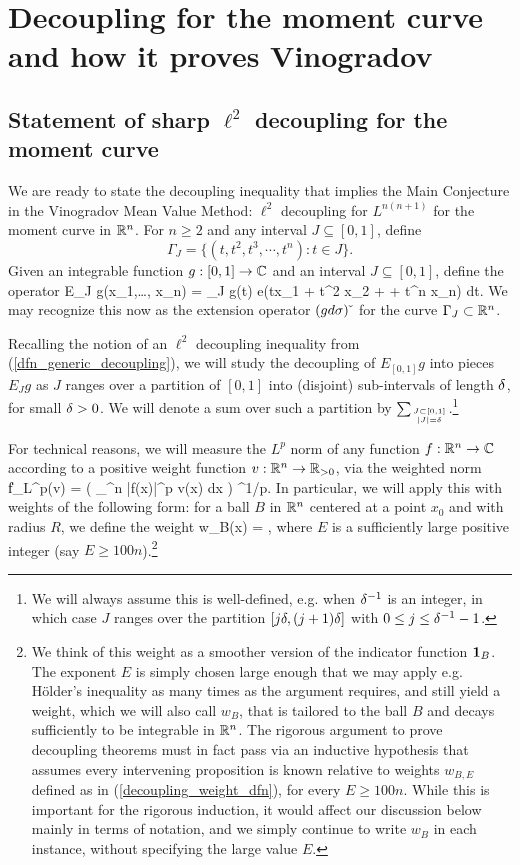 \documentclass[brochure,english,12pt]{bourbaki}%
\newcommand{\C}{\mathbb{C}}
\begin{document}
\section{Decoupling for the moment curve and how it proves Vinogradov}\label{sec_decoupling_VMVT}
\subsection{Statement of sharp $\ell^2$ decoupling for the moment curve}
We are ready to state the decoupling inequality that implies the Main Conjecture in the Vinogradov Mean Value Method: $\ell^2$ decoupling for $L^{n(n+1)}$ for the moment curve in $\mathbb{R}^n$. For $n \geq 2$ and any interval $J \subseteq [0,1]$, define 
\[ \Gamma_J = \{ (t,t^2, t^3, \cdots, t^n): t\in J \}.\]
Given an integrable function $g : [0,1] \maps \C$ and an interval $J \subseteq [0,1]$, define the operator
\beq\label{extn_Ga_op}
 E_J g(x_1,\ldots, x_n) = \int_J g(t) e(tx_1 + t^2 x_2 + \cdots + t^n x_n) dt.
 \eeq
We may recognize this now as the extension operator $(g d\sigma)\check{\;}$ for the curve $\Gamma_J \subset \mathbb{R}^n$.


Recalling the notion of an $\ell^2$ decoupling inequality from (\ref{dfn_generic_decoupling}), we will study the decoupling of $E_{[0,1]}g$ into pieces $E_Jg$ as $J$ ranges over a partition of $[0,1]$ into (disjoint) sub-intervals of length $\delta$, for  small $\delta>0$. We will denote a sum over such a partition by $\sum_{J \subset [0,1] \atop |J|=\delta}$.\footnote{We will always assume this is well-defined, e.g. when $\delta^{-1}$ is an integer, in which case $J$ ranges over the partition $[j\delta, (j+1)\delta]$ with $0 \leq j \leq \delta^{-1}-1$.}


For technical reasons, we will measure the $L^p$ norm of any function $f : \R^n \maps \C$ according to a positive weight function $v: \mathbb{R}^n \rightarrow \mathbb{R}_{>0}$, via the weighted norm
\beq\label{decoupling_weighted_norm}
 \|f\|_{L^p(v)} = ( \int_{\R^n} |f(x)|^p v(x) dx ) ^{1/p}.
 \eeq
In particular, we will apply this with weights of the following form: for a ball $B$ in $\mathbb{R}^n$ centered at a point $x_0$ and with radius $R$, we define the weight
\beq\label{decoupling_weight_dfn}
 w_B(x) = ,
 \eeq
 where $E$ is a sufficiently large positive integer (say $E \geq 100n$).\footnote{We think of this weight as a smoother version of the indicator function $\boldsymbol1_B$. The exponent $E$ is simply chosen large enough that we may apply e.g. H\"{o}lder's inequality as many times as the argument requires, and still yield a weight, which we will also call $w_B$, that is tailored to the ball $B$ and decays sufficiently to be integrable in $\mathbb{R}^n$.
The rigorous argument to prove decoupling theorems must in fact pass via an inductive hypothesis that assumes every intervening proposition is known relative to weights $w_{B,E}$ defined as in (\ref{decoupling_weight_dfn}), for every $E \geq 100n$. While this is important for the rigorous induction, it would affect our discussion below mainly in terms of notation, and we simply continue to write $w_B$ in each instance, without specifying the large value $E$.}
\end{document}
